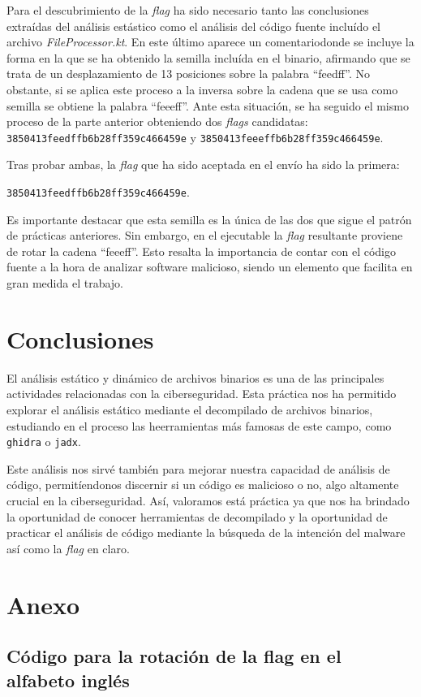 \documentclass[]{article}
\begin{document}
Para el descubrimiento de la \textit{flag} ha sido necesario tanto las
conclusiones extraídas del análisis estástico como el análisis del código
fuente incluído el archivo \textit{FileProcessor.kt}. En este último aparece un
comentariodonde se incluye la forma en la que se ha obtenido la semilla
incluída en el binario, afirmando que se trata de un desplazamiento de 13
posiciones sobre la palabra ``feedff''. No obstante, si se aplica este proceso
a la inversa sobre la cadena que se usa como semilla se obtiene la palabra
``feeeff''. Ante esta situación, se ha seguido el mismo proceso de la parte
anterior obteniendo dos \textit{flags} candidatas:
\texttt{3850413feedffb6b28ff359c466459e} y
\texttt{3850413feeeffb6b28ff359c466459e}. 

Tras probar ambas, la \textit{flag} que ha sido aceptada en el envío ha sido la
primera: 

\noindent
\texttt{3850413feedffb6b28ff359c466459e}. 

Es importante destacar que esta semilla es la única de las dos que sigue el
patrón de prácticas anteriores. Sin embargo, en el ejecutable la \textit{flag}
resultante proviene de rotar la cadena ``feeeff''. Esto resalta la importancia
de contar con el código fuente a la hora de analizar software malicioso, siendo
un elemento que facilita en gran medida el trabajo.

\section{Conclusiones}
\label{sec:conclusion}
El análisis estático y dinámico de archivos binarios es una de las principales
actividades relacionadas con la ciberseguridad. Esta práctica nos ha permitido
explorar el análisis estático mediante el decompilado de archivos binarios,
estudiando en el proceso las heerramientas más famosas de este campo, como
\texttt{ghidra} o \texttt{jadx}.

Este análisis nos sirvé también para mejorar nuestra capacidad de análisis de
código, permitíendonos discernir si un código es malicioso o no, algo altamente
crucial en la ciberseguridad. Así, valoramos está práctica ya que nos ha
brindado la oportunidad de conocer herramientas de decompilado y la oportunidad
de practicar el análisis de código mediante la búsqueda de la intención del
malware así como la \textit{flag} en claro.

\newpage
{}
\section*{Anexo}

\subsection*{Código para la rotación de la flag en el alfabeto inglés}
\lstset{style=python}

\end{document}
